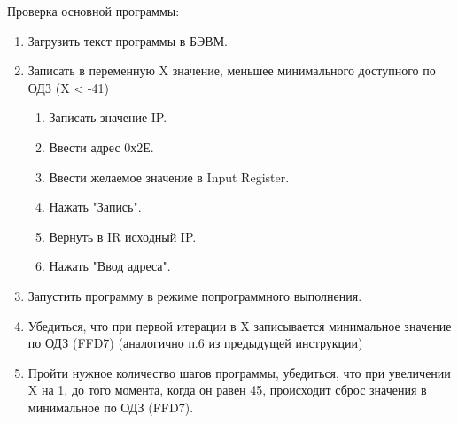 Проверка основной программы:
\begin{enumerate}
    \item Загрузить текст программы в БЭВМ.
    \item Записать в переменную X значение, меньшее минимального доступного по ОДЗ (X < -41)
    \begin{enumerate}
        \item Записать значение IP.
        \item Ввести адрес 0х2Е.
        \item Ввести желаемое значение в Input Register.
        \item Нажать "Запись".
        \item Вернуть в IR исходный IP.
        \item Нажать "Ввод адреса".
    \end{enumerate}
    \item Запустить программу в режиме попрограммного выполнения.
    \item Убедиться, что при первой итерации в X записывается минимальное значение по ОДЗ (FFD7) (аналогично п.6 из предыдущей инструкции)
    \item Пройти нужное количество шагов программы, убедиться, что при увеличении X на 1, до того момента, когда он равен 45, происходит сброс значения в
    минимальное по ОДЗ (FFD7).
\end{enumerate}

